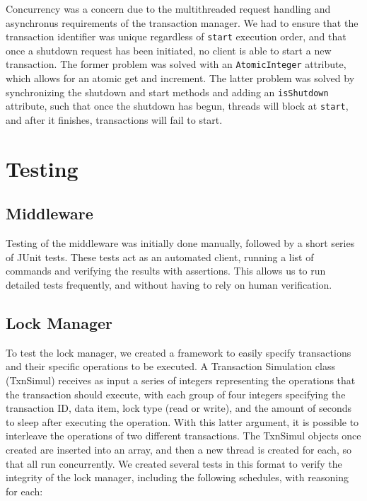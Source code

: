 \documentclass[11pt]{article}
\begin{document}
Concurrency was a concern due to the multithreaded request handling and asynchronus requirements of the transaction manager. We had to ensure that the transaction identifier was unique regardless of \texttt{start} execution order, and that once a shutdown request has been initiated, no client is able to start a new transaction. The former problem was solved with an \texttt{AtomicInteger} attribute, which allows for an atomic get and increment. The latter problem was solved by synchronizing the shutdown and start methods and adding an \texttt{isShutdown} attribute, such that once the shutdown has begun, threads will block at \texttt{start}, and after it finishes, transactions will fail to start. \par

\section*{Testing}

\subsection*{Middleware}

Testing of the middleware was initially done manually, followed by a short series of JUnit tests. These tests act as an automated client, running a list of commands and verifying the results with assertions. This allows us to run detailed tests frequently, and without having to rely on human verification.  \par

\subsection*{Lock Manager}

To test the lock manager, we created a framework to easily specify transactions and their specific operations to be executed. A Transaction Simulation class (TxnSimul) receives as input a series of integers representing the operations that the transaction should execute, with each group of four integers specifying the transaction ID, data item, lock type (read or write), and the amount of seconds to sleep after executing the operation. With this latter argument, it is possible to interleave the operations of two different transactions. The TxnSimul objects once created are inserted into an array, and then a new thread is created for each, so that all run concurrently. We created several tests in this format to verify the integrity of the lock manager, including the following schedules, with reasoning for each:
\end{document}
